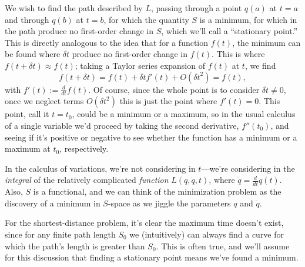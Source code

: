 \documentclass{article}
\newcommand{\md}{d}
\newcommand{\mderiv}[1]{\frac{\md}{\md {#1}}} %
\newcommand{\mvar}{t}
\begin{document}
We wish to find the path described by $L$, passing through a point $q(a)$ at $\mvar=a$ and through $q(b)$ at $\mvar=b$, for which the quantity $S$ is a minimum, for which  in the path produce no first-order change in $S$, which we'll call a ``stationary point.''  This is directly analogous to the idea that for a function $f(t)$, the minimum can be found where  $\delta t$ produce no first-order change in $f(t)$.  This is where $f(t + \delta t) \approx f(t)$; taking a Taylor series expansion of $f(t)$ at $t$, we find
\begin{equation}
f(t + \delta t) = f(t) + \delta t f'(t) + O({\delta t}^2) = f(t),
\end{equation}
with $f'(t) := \mderiv{t}{f(t)}$.  Of course, since the whole point is to consider $\delta t \neq 0$, once we neglect terms $O({\delta t}^2)$ this is just the point where $f'(t) = 0$.  This point, call it $t = t_0$, could be a minimum or a maximum, so in the usual calculus of a single variable we'd proceed by taking the second derivative, $f''(t_0)$, and seeing if it's positive or negative to see whether the function has a minimum or a maximum at $t_0$, respectively.

In the calculus of variations, we're not considering  in $t$---we're considering  in the \emph{integral} of the relatively complicated \emph{function} $L(q,\dot{q}, \mvar)$, where $\dot{q} = \mderiv{\mvar}{q(\mvar)}$.  Also, $S$ is a functional, and we can think of the minimization problem as the discovery of a minimum in $S$-space as we jiggle the parameters $q$ and $\dot{q}$.

For the shortest-distance problem, it's clear the maximum time doesn't exist, since for any finite path length $S_0$ we (intuitively) can always find a curve for which the path's length is greater than $S_0$.  This is often true, and we'll assume for this discussion that finding a stationary point means we've found a minimum.
\end{document}
